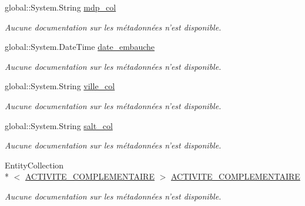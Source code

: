 \begin{DoxyCompactItemize}
global\-::\-System.\-String \hyperlink{class_model_1_1_c_o_l_l_a_b_o_r_a_t_e_u_r_a2099c578d33f2851b0a914aeca8a3234}{mdp\-\_\-col}
\begin{DoxyCompactList}\small\item\em Aucune documentation sur les métadonnées n'est disponible. \end{DoxyCompactList}\item 
global\-::\-System.\-Date\-Time \hyperlink{class_model_1_1_c_o_l_l_a_b_o_r_a_t_e_u_r_afa00e01e2baf6b90075dd32abfd0b72f}{date\-\_\-embauche}
\begin{DoxyCompactList}\small\item\em Aucune documentation sur les métadonnées n'est disponible. \end{DoxyCompactList}\item 
global\-::\-System.\-String \hyperlink{class_model_1_1_c_o_l_l_a_b_o_r_a_t_e_u_r_a52fce134f10bc131943353de60abd8cf}{ville\-\_\-col}
\begin{DoxyCompactList}\small\item\em Aucune documentation sur les métadonnées n'est disponible. \end{DoxyCompactList}\item 
global\-::\-System.\-String \hyperlink{class_model_1_1_c_o_l_l_a_b_o_r_a_t_e_u_r_ae5aa55abe9ea993f8533e563a91485e0}{salt\-\_\-col}
\begin{DoxyCompactList}\small\item\em Aucune documentation sur les métadonnées n'est disponible. \end{DoxyCompactList}\item 
Entity\-Collection\\*
$<$ \hyperlink{class_model_1_1_a_c_t_i_v_i_t_e___c_o_m_p_l_e_m_e_n_t_a_i_r_e}{A\-C\-T\-I\-V\-I\-T\-E\-\_\-\-C\-O\-M\-P\-L\-E\-M\-E\-N\-T\-A\-I\-R\-E} $>$ \hyperlink{class_model_1_1_c_o_l_l_a_b_o_r_a_t_e_u_r_a59cd341498640349d6b9ea0c8ade35e1}{A\-C\-T\-I\-V\-I\-T\-E\-\_\-\-C\-O\-M\-P\-L\-E\-M\-E\-N\-T\-A\-I\-R\-E}
\begin{DoxyCompactList}\small\item\em Aucune documentation sur les métadonnées n'est disponible. \end{DoxyCompactList}\item 

\end{DoxyCompactItemize}
